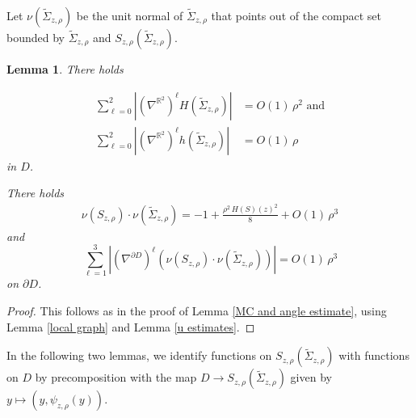 \documentclass[11pt]{amsart}
\newtheorem{lem}[prop]{Lemma}
\begin{document}
Let  $\nu(\tilde \Sigma_{z,\rho})$ be the unit normal of $\tilde \Sigma_{z,\rho}$ that points out of the compact set bounded by $\tilde \Sigma_{z,\rho}$ and $S_{z,\rho}(\tilde \Sigma_{z,\rho})$.


\begin{lem} \label{rho MC}
	There holds

\begin{align*} 
	\sum_{\ell=0}^2|(\nabla^{\mathbb{R}^2})^\ell H(\tilde \Sigma_{z,\rho})|&=O(1)\,\rho^2\text{ and}\\
	\sum_{\ell=0}^2|(\nabla^{\mathbb{R}^2})^\ell h(\tilde \Sigma_{z,\rho})|&=O(1)\,\rho 
\end{align*}
in $D$.
	
	There holds  
	\begin{align} \label{compact angle} 
	\nu(S_{z,\rho})\cdot \nu(\tilde \Sigma_{z,\rho})=-1+\frac{\rho^2\,H(S)(z)^2}{8}+O(1)\,\rho^3
	\end{align}
	and 
	$$
\sum_{\ell=1}^3|(\nabla^{\partial D})^\ell	(\nu(S_{z,\rho})\cdot \nu(\tilde \Sigma_{z,\rho}))|=O(1)\,\rho^3
	$$ 
	on $\partial D$.
\end{lem}
\begin{proof} 
	This follows as in the proof of Lemma \ref{MC and angle estimate}, using Lemma \ref{local graph} and  Lemma \ref{u estimates}.
	
	
\end{proof}
In the following two lemmas, we identify functions on  $S_{z,\rho}(\tilde \Sigma_{z,\rho})$ with functions on $D$ by precomposition with the map 
$D\to S_{z,\rho}(\tilde \Sigma_{z,\rho})$ given by $y\mapsto (y,\psi_{z,\rho}(y)).$
\end{document}
